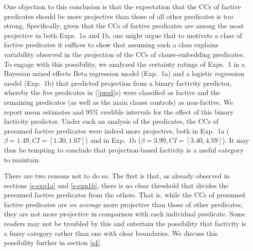 \documentclass[11pt,fleqn]{article}
\newcommand{\6}{\mbox{$[\hspace*{-.6mm}[$}}
\newcommand{\9}{\mbox{$]\hspace*{-.6mm}]$}}
\begin{document}
One objection to this conclusion is that the expectation that the CCs of factive predicates should be more projective than those of all other predicates is too strong. Specifically, given that the CCs of factive predicates are among the most projective in both Exps.~1a and 1b, one might argue that to motivate a class of factive predicates it suffices to show that assuming such a class explains  variability observed in the projection of the CCs of clause-embedding predicates. To engage with this possibility, we analyzed the certainty ratings of Exps.~1 in a Bayesian mixed effects Beta regression model (Exp.~1a) and a logistic regression model (Exp.~1b) that predicted projection from a binary factivity predictor, whereby the five predicates in (\ref{pred}a) were classified as factive and the remaining predicates (as well as the main clause controls) as non-factive. We report mean estimates and 95\% credible intervals for the effect of this binary factivity predictor. Under such an analysis of the predicates, the CCs of presumed factive predicates were indeed more projective, both in Exp.~1a ($\beta = 1.49, CI = [1.30, 1.67]$) and in Exp.~1b ($\beta = 3.99, CI = [3.40,4.59]$). It may thus be tempting to conclude that projection-based factivity is a useful category to maintain.

There are two reasons not to do so. The first is that, as already observed in sections  \ref{s-exp1a} and \ref{s-exp1b}, there is no clear threshold that divides the presumed factive predicates from the others. That is, while the CCs of presumed factive predicates are \emph{on average} more projective than those of other predicates, they are not more projective in comparison with each individual predicate.  Some readers may not be troubled by this and entertain the possibility that factivity is a fuzzy category rather than one with clear boundaries. We discuss this possibility further in section \ref{s4}.
\end{document}
